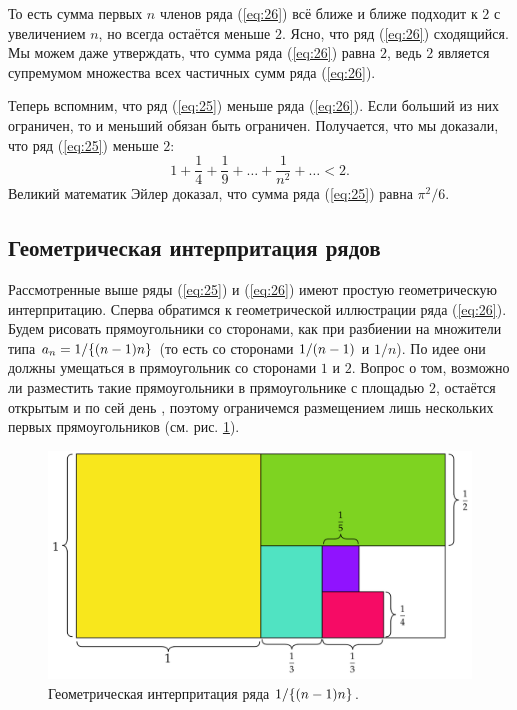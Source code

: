 \documentclass[12pt]{article}
\begin{document}
То есть сумма первых $n$ членов ряда (\ref{eq:26}) всё ближе и ближе подходит к $2$ с увеличением $n$, но всегда остаётся меньше $2$. Ясно, что ряд (\ref{eq:26}) сходящийся. Мы можем даже утверждать, что сумма ряда (\ref{eq:26}) равна $2$, ведь $2$ является супремумом множества всех частичных сумм ряда (\ref{eq:26}).
\par
Теперь вспомним, что ряд (\ref{eq:25}) меньше ряда (\ref{eq:26}). Если больший из них ограничен, то и меньший обязан быть ограничен. Получается, что мы доказали, что ряд (\ref{eq:25}) меньше $2$:
\begin{equation}
    1 + \dfrac{1}{4} + \dfrac{1}{9} + \ldots + \dfrac{1}{n^2} + \ldots < 2.
\end{equation}
Великий математик Эйлер доказал, что сумма ряда (\ref{eq:25}) равна ${\pi^2}/{6}$.
\subsection{Геометрическая интерпритация рядов}
Рассмотренные выше ряды (\ref{eq:25}) и (\ref{eq:26}) имеют простую геометрическую интерпритацию. Сперва обратимся к геометрической иллюстрации ряда (\ref{eq:26}). Будем рисовать прямоугольники со сторонами, как при разбиении на множители типа $a_n = {1}/\qty{\qty(n-1)n}$ (то есть со сторонами ${1}/\qty(n-1)$ и ${1}/{n}$). По идее они должны умещаться в прямоугольник со сторонами $1$ и $2$. Вопрос о том, возможно ли разместить такие прямоугольники в прямоугольнике с площадью $2$, остаётся открытым и по сей день \cite{1,2,3}, поэтому ограничемся размещением лишь нескольких первых прямоугольников (см. рис. \ref{fig:5}).
\begin{figure}[ht]
    \centering
    \includegraphics[width = 1\textwidth]{fig5.png}
    \caption{Геометрическая интерпритация ряда ${1}/\qty{\qty(n-1)n}$.}
    \label{fig:5}
\end{figure}
\end{document}
